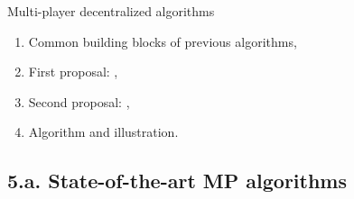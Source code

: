 \documentclass[12pt,english,ignorenonframetext,aspectratio=169,]{beamer}
\providecommand{\tightlist}{%
  \setlength{\itemsep}{0pt}\setlength{\parskip}{0pt}}
\begin{document}
\begin{frame}{Multi-player decentralized algorithms}

\begin{enumerate}
\def\labelenumi{\arabic{enumi}.}
\tightlist
\item
  Common building blocks of previous algorithms,\vspace*{15pt}
\item
  First proposal: \RandTopM,\vspace*{15pt}
\item
  Second proposal: \MCTopM,\vspace*{15pt}
\item
  Algorithm and illustration.
\end{enumerate}

\end{frame}



\subsection{\hfill{}5.a. State-of-the-art MP algorithms\hfill{}}
\end{document}
